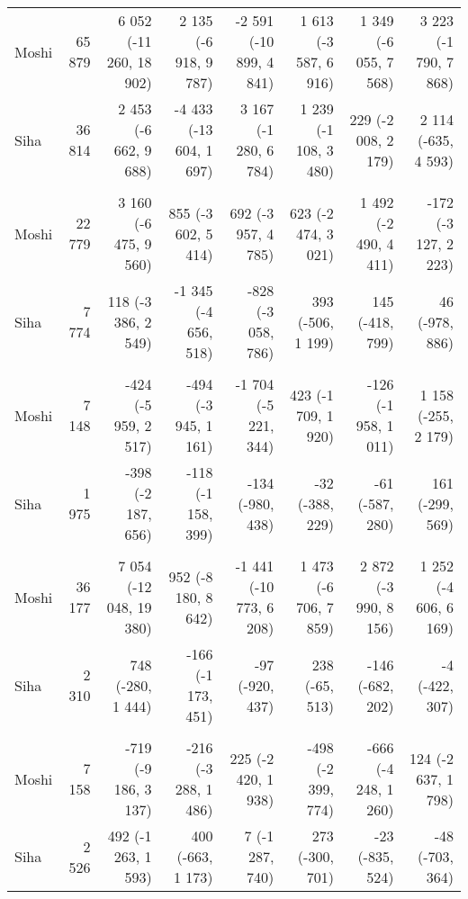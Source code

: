 \begin{table}[t]
\begin{tabular*}{\linewidth}{@{\extracolsep{\fill}}l|rrrrrrr}
\midrule\addlinespace[2.5pt]
\multicolumn{8}{l}{Peptic Ulcers} \\[2.5pt] 
\midrule\addlinespace[2.5pt]
Moshi & 65 879 & 6 052 (-11 260, 18 902)  & 2 135 (-6 918, 9 787)  & -2 591 (-10 899, 4 841)  & 1 613 (-3 587, 6 916)  & 1 349 (-6 055, 7 568)  & 3 223 (-1 790, 7 868)  \\ 
Siha & 36 814 & 2 453 (-6 662, 9 688)  & -4 433 (-13 604, 1 697)  & 3 167 (-1 280, 6 784)  & 1 239 (-1 108, 3 480)  & 229 (-2 008, 2 179)  & 2 114 (-635, 4 593)  \\ 
\midrule\addlinespace[2.5pt]
\multicolumn{8}{l}{Epilepsy} \\[2.5pt] 
\midrule\addlinespace[2.5pt]
Moshi & 22 779 & 3 160 (-6 475, 9 560)  & 855 (-3 602, 5 414)  & 692 (-3 957, 4 785)  & 623 (-2 474, 3 021)  & 1 492 (-2 490, 4 411)  & -172 (-3 127, 2 223)  \\ 
Siha & 7 774 & 118 (-3 386, 2 549)  & -1 345 (-4 656, 518)  & -828 (-3 058, 786)  & 393 (-506, 1 199)  & 145 (-418, 799)  & 46 (-978, 886)  \\ 
\midrule\addlinespace[2.5pt]
\multicolumn{8}{l}{Neuroses} \\[2.5pt] 
\midrule\addlinespace[2.5pt]
Moshi & 7 148 & -424 (-5 959, 2 517)  & -494 (-3 945, 1 161)  & -1 704 (-5 221, 344)  & 423 (-1 709, 1 920)  & -126 (-1 958, 1 011)  & 1 158 (-255, 2 179)  \\ 
Siha & 1 975 & -398 (-2 187, 656)  & -118 (-1 158, 399)  & -134 (-980, 438)  & -32 (-388, 229)  & -61 (-587, 280)  & 161 (-299, 569)  \\ 
\midrule\addlinespace[2.5pt]
\multicolumn{8}{l}{Psychoses} \\[2.5pt] 
\midrule\addlinespace[2.5pt]
Moshi & 36 177 & 7 054 (-12 048, 19 380)  & 952 (-8 180, 8 642)  & -1 441 (-10 773, 6 208)  & 1 473 (-6 706, 7 859)  & 2 872 (-3 990, 8 156)  & 1 252 (-4 606, 6 169)  \\ 
Siha & 2 310 & 748 (-280, 1 444)  & -166 (-1 173, 451)  & -97 (-920, 437)  & 238 (-65, 513)  & -146 (-682, 202)  & -4 (-422, 307)  \\ 
\midrule\addlinespace[2.5pt]
\multicolumn{8}{l}{Dysentery} \\[2.5pt] 
\midrule\addlinespace[2.5pt]
Moshi & 7 158 & -719 (-9 186, 3 137)  & -216 (-3 288, 1 486)  & 225 (-2 420, 1 938)  & -498 (-2 399, 774)  & -666 (-4 248, 1 260)  & 124 (-2 637, 1 798)  \\ 
Siha & 2 526 & 492 (-1 263, 1 593)  & 400 (-663, 1 173)  & 7 (-1 287, 740)  & 273 (-300, 701)  & -23 (-835, 524)  & -48 (-703, 364)  \\ 

\end{tabular*}
\end{table}
